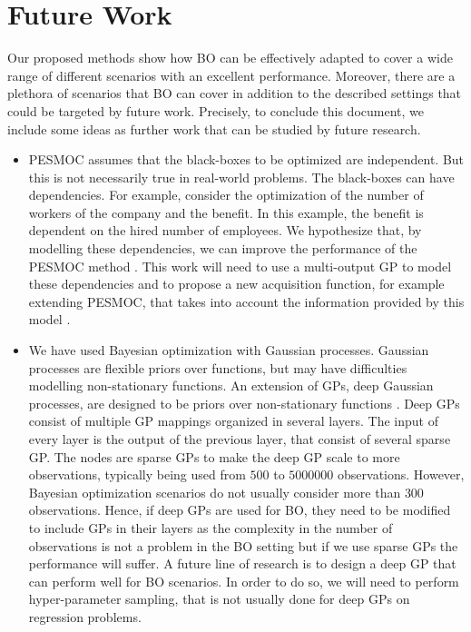 \section{Future Work}
Our proposed methods show how BO can be effectively adapted to cover a wide range of different scenarios with an excellent performance. Moreover, there are a plethora of scenarios that BO can cover in addition to the described settings that could be targeted by future work. Precisely, to conclude this document, we include some ideas as further work that can be studied by future research.
\begin{itemize}
    \item PESMOC assumes that the black-boxes to be optimized are independent. But this is not necessarily true in real-world problems. The black-boxes can have dependencies. For example, consider the optimization of the number of workers of the company and the benefit. In this example, the benefit is dependent on the hired number of employees. We hypothesize that, by modelling these dependencies, we can improve the performance of the PESMOC method \citep{shah2016pareto}. This work will need to use a multi-output GP to model these dependencies and to propose a new acquisition function, for example extending PESMOC, that takes into account the information provided by this model \citep{moreno2018heterogeneous}.
    \item We have used Bayesian optimization with Gaussian processes. Gaussian processes are flexible priors over functions, but may have difficulties modelling non-stationary functions. An extension of GPs, deep Gaussian processes, are designed to be priors over non-stationary functions \citep{damianou2013deep, bui2016deep}. Deep GPs consist of multiple GP mappings organized in several layers. The input of every layer is the output of the previous layer, that consist of several sparse GP. The nodes are sparse GPs to make the deep GP scale to more observations, typically being used from $500$ to $5000000$ observations. However, Bayesian optimization scenarios do not usually consider more than $300$ observations. Hence, if deep GPs are used for BO, they need to be modified to include GPs in their layers as the complexity in the number of observations is not a problem in the BO setting but if we use sparse GPs the performance will suffer. A future line of research is to design a deep GP that can perform well for BO scenarios. In order to do so, we will need to perform hyper-parameter sampling, that is not usually done for deep GPs on regression problems.

\end{itemize}
